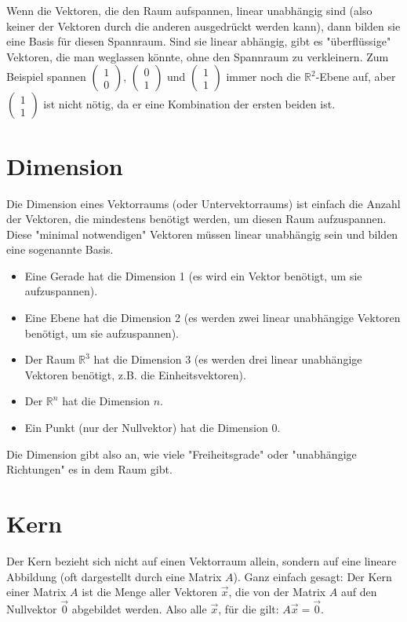 Wenn die Vektoren, die den Raum aufspannen, linear unabhängig sind (also keiner
der Vektoren durch die anderen ausgedrückt werden kann), dann bilden sie eine
Basis für diesen Spannraum. Sind sie linear abhängig, gibt es "überflüssige"
Vektoren, die man weglassen könnte, ohne den Spannraum zu verkleinern. Zum
Beispiel spannen \(\begin{pmatrix} 1 \\ 0 \end{pmatrix}\), \(\begin{pmatrix} 0 \\ 1 \end{pmatrix}\) und \(\begin{pmatrix} 1 \\ 1 \end{pmatrix}\) immer noch die \(\mathbb{R}^2\)-Ebene auf, aber \(\begin{pmatrix} 1 \\ 1 \end{pmatrix}\) ist nicht nötig, da er eine Kombination der ersten beiden ist.

\section{Dimension}
Die Dimension eines Vektorraums (oder Untervektorraums) ist einfach die Anzahl
der Vektoren, die mindestens benötigt werden, um diesen Raum aufzuspannen.
Diese "minimal notwendigen" Vektoren müssen linear unabhängig sein und bilden
eine sogenannte Basis.
\begin{itemize}
    \item Eine Gerade hat die Dimension 1 (es wird ein Vektor benötigt, um sie
          aufzuspannen).
    \item Eine Ebene hat die Dimension 2 (es werden zwei linear unabhängige Vektoren
          benötigt, um sie aufzuspannen).
    \item Der Raum \(\mathbb{R}^3\) hat die Dimension 3 (es werden drei linear
          unabhängige Vektoren benötigt, z.B. die Einheitsvektoren).
    \item Der \(\mathbb{R}^n\) hat die Dimension \(n\).
    \item Ein Punkt (nur der Nullvektor) hat die Dimension 0.
\end{itemize}
Die Dimension gibt also an, wie viele "Freiheitsgrade" oder "unabhängige Richtungen" es in dem Raum gibt.

\section{Kern}
Der Kern bezieht sich nicht auf einen Vektorraum allein, sondern auf eine
lineare Abbildung (oft dargestellt durch eine Matrix \(A\)). Ganz einfach
gesagt: Der Kern einer Matrix \(A\) ist die Menge aller Vektoren \(\vec{x}\),
die von der Matrix \(A\) auf den Nullvektor \(\vec{0}\) abgebildet werden. Also
alle \(\vec{x}\), für die gilt: \(A\vec{x} = \vec{0}\).

